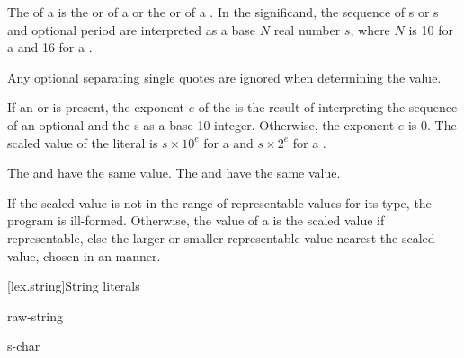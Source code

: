 \pnum
{}%
The  of a 
is the  or 
of a 
or the 
or 
of a .
In the significand,
the sequence of s or s
and optional period are interpreted as a base $N$ real number $s$,
where $N$ is 10 for a  and
16 for a .
\begin{note}
Any optional separating single quotes are ignored when determining the value.
\end{note}
If an  or 
is present,
the exponent $e$ of the 
is the result of interpreting
the sequence of an optional  and the s
as a base 10 integer.
Otherwise, the exponent $e$ is 0.
The scaled value of the literal is
$s \times 10^e$ for a  and
$s \times 2^e$ for a .
\begin{example}
The 
 and  have the same value.
The 
 and 
have the same value.
\end{example}

\pnum
If the scaled value is not in the range of representable
values for its type, the program is ill-formed.
Otherwise, the value of a 
is the scaled value if representable,
else the larger or smaller representable value nearest the scaled value,
chosen in an  manner.

[lex.string]{String literals}

%
\begin{bnf}
\br
       \br
      raw-string
\end{bnf}

\begin{bnf}
\br
    s-char 
\end{bnf}

